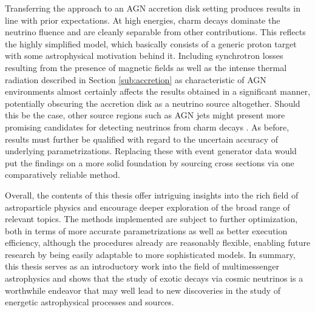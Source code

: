\begin{spacing}{0.990}
	Transferring the approach to an AGN accretion disk setting produces results in line with prior expectations. At high energies,
	charm decays dominate the neutrino fluence and are cleanly separable from other contributions. This reflects the highly simplified
	model, which basically consists of a generic proton target with some astrophysical motivation behind it. Including synchrotron
	losses resulting from the presence of magnetic fields as well as the intense thermal radiation described in Section \ref{sub:accretion}
	as characteristic of AGN environments almost certainly affects the results obtained in a significant manner, potentially
	obscuring the accretion disk as a neutrino source altogether. Should this be the case, other source regions such as AGN jets
	might present more promising candidates for detecting neutrinos from charm decays \cite{Murase_2023}. As before, results must
	further be qualified with regard to the uncertain accuracy of underlying parametrizations. Replacing these with event generator
	data would put the findings on a more solid foundation by sourcing cross sections via one comparatively reliable method.
	\enlargethispage*{\baselineskip}\newpage
\end{spacing}

Overall, the contents of this thesis offer intriguing insights into the rich field of astroparticle physics and encourage deeper
exploration of the broad range of relevant topics. The methods implemented are subject to further optimization, both in terms
of more accurate parametrizations as well as better execution efficiency, although the procedures already are reasonably flexible,
enabling future research by being easily adaptable to more sophisticated models. In summary, this thesis serves as an introductory
work into the field of multimessenger astrophysics and shows that the study of exotic decays via cosmic neutrinos is a worthwhile
endeavor that may well lead to new discoveries in the study of energetic astrophysical processes and sources.

